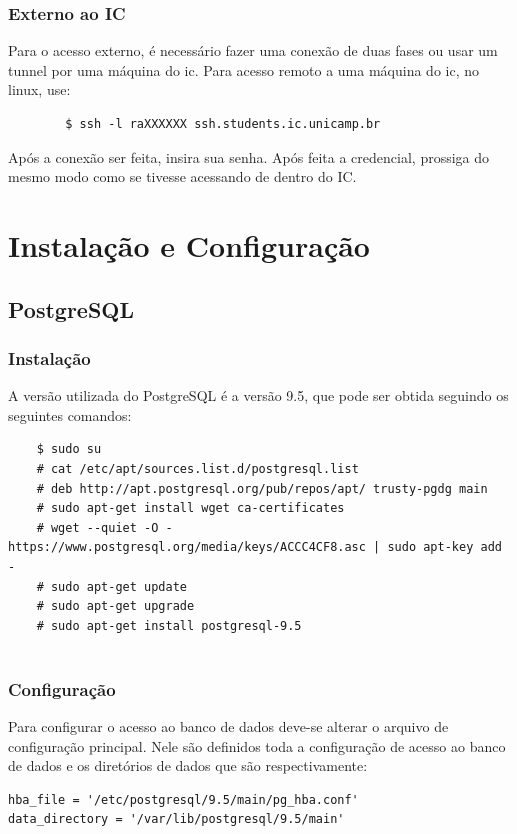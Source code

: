 \documentclass[a4paper,10pt]{article}
\begin{document}
        \subsubsection{Externo ao IC}
        Para o acesso externo, é necessário fazer uma conexão de duas fases ou usar um tunnel por uma máquina do ic. Para acesso remoto a uma máquina do ic, no linux, use:
        \begin{verbatim}
        $ ssh -l raXXXXXX ssh.students.ic.unicamp.br
        \end{verbatim}
        Após a conexão ser feita, insira sua senha. Após feita a credencial, prossiga do mesmo modo como se tivesse acessando de dentro do IC.
        
\section{Instalação e Configuração}
    \subsection{PostgreSQL}
    \subsubsection{Instalação}
    A versão utilizada do PostgreSQL é a versão 9.5, que pode ser obtida seguindo os seguintes comandos:
    \begin{verbatim}
    $ sudo su
    # cat /etc/apt/sources.list.d/postgresql.list
    # deb http://apt.postgresql.org/pub/repos/apt/ trusty-pgdg main
    # sudo apt-get install wget ca-certificates
    # wget --quiet -O - https://www.postgresql.org/media/keys/ACCC4CF8.asc | sudo apt-key add -
    # sudo apt-get update
    # sudo apt-get upgrade
    # sudo apt-get install postgresql-9.5
    
    \end{verbatim}
    \subsubsection{Configuração}
    Para configurar o acesso ao banco de dados deve-se alterar o arquivo de configuração principal. Nele são definidos toda a configuração de acesso ao banco de dados e os diretórios de dados que são respectivamente: 
    \begin{verbatim}
hba_file = '/etc/postgresql/9.5/main/pg_hba.conf'
data_directory = '/var/lib/postgresql/9.5/main'
    \end{verbatim}
    
\end{document}
